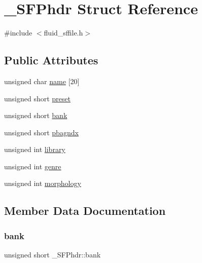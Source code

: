\hypertarget{struct__SFPhdr}{}\section{\+\_\+\+S\+F\+Phdr Struct Reference}
\label{struct__SFPhdr}


{\ttfamily \#include $<$fluid\+\_\+sffile.\+h$>$}

\subsection*{Public Attributes}
\begin{DoxyCompactItemize}
\item 
unsigned char \hyperlink{struct__SFPhdr_a2905995d954cc40ab3b5a29cec2d43e5}{name} \mbox{[}20\mbox{]}
\item 
unsigned short \hyperlink{struct__SFPhdr_aaa48440f19080bc8362e8c609fe2ec89}{preset}
\item 
unsigned short \hyperlink{struct__SFPhdr_af15367f52fc2980c2369eea0c392ffb9}{bank}
\item 
unsigned short \hyperlink{struct__SFPhdr_a2a471be8e91f10235dd848085f8b30f1}{pbagndx}
\item 
unsigned int \hyperlink{struct__SFPhdr_aa9aff4054b03a97f2b4ce41023302638}{library}
\item 
unsigned int \hyperlink{struct__SFPhdr_a60a8b7f1bdb84c704b2bb459d7ee4bc4}{genre}
\item 
unsigned int \hyperlink{struct__SFPhdr_aa475073949ca37f7bccd07c312f398e2}{morphology}
\end{DoxyCompactItemize}


\subsection{Member Data Documentation}
\mbox{\label{struct__SFPhdr_af15367f52fc2980c2369eea0c392ffb9}} 
\subsubsection{\texorpdfstring{bank}{bank}}
{\footnotesize\ttfamily unsigned short \+\_\+\+S\+F\+Phdr\+::bank}

\mbox{\label{struct__SFPhdr_a60a8b7f1bdb84c704b2bb459d7ee4bc4}} 
